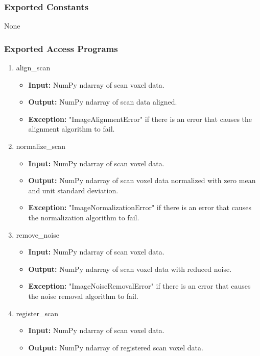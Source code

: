 \documentclass[12pt, titlepage]{article}
\begin{document}
\subsubsection{Exported Constants}
None
\subsubsection{Exported Access Programs}

\begin{enumerate}
  \item align\_scan
        \begin{itemize}
          \item \textbf{Input:} NumPy ndarray of scan voxel data.
          \item \textbf{Output:} NumPy ndarray of scan data aligned.
          \item \textbf{Exception:} "ImageAlignmentError" if there is an error that causes the
                alignment algorithm to fail.
        \end{itemize}
  \item normalize\_scan
        \begin{itemize}
          \item \textbf{Input:} NumPy ndarray of scan voxel data.
          \item \textbf{Output:} NumPy ndarray of scan voxel data normalized with zero mean and unit standard deviation.
          \item \textbf{Exception:} "ImageNormalizationError" if there is an error that causes the
                normalization algorithm to fail.
        \end{itemize}
  \item remove\_noise
        \begin{itemize}
          \item \textbf{Input:} NumPy ndarray of scan voxel data.
          \item \textbf{Output:} NumPy ndarray of scan voxel data with reduced noise.
          \item \textbf{Exception:} "ImageNoiseRemovalError" if there is an error that causes the
                noise removal algorithm to fail.
        \end{itemize}
  \item register\_scan
        \begin{itemize}
          \item \textbf{Input:} NumPy ndarray of scan voxel data.
          \item \textbf{Output:} NumPy ndarray of registered scan voxel data.

\end{itemize}
\end{enumerate}
\end{document}
